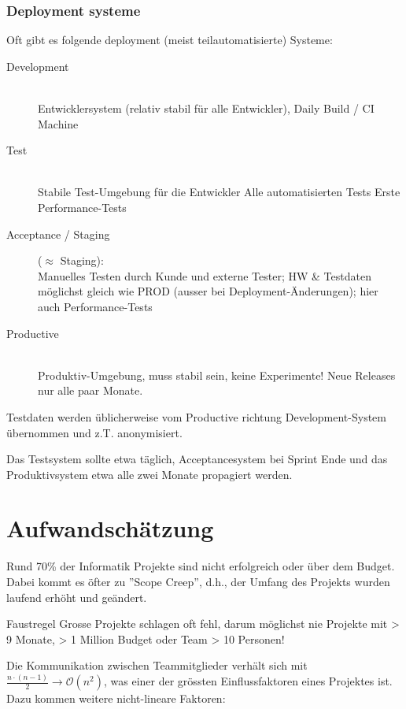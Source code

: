 \subsubsection{Deployment systeme}

Oft gibt es folgende deployment (meist teilautomatisierte) Systeme:
\begin{description}
	\item[Development] \hfill \\ Entwicklersystem (relativ stabil für alle Entwickler), Daily Build / CI Machine
	\item[Test] \hfill \\ Stabile Test-Umgebung für die Entwickler Alle automatisierten Tests Erste Performance-Tests
	\item[Acceptance / Staging] ($\approx$ Staging): \hfill \\ Manuelles Testen durch Kunde und externe Tester; HW \& Testdaten möglichst gleich wie PROD (ausser bei Deployment-Änderungen); hier auch Performance-Tests
	\item[Productive] \hfill \\ Produktiv-Umgebung, muss stabil sein, keine Experimente! Neue Releases nur alle paar Monate.
\end{description}

Testdaten werden üblicherweise vom Productive richtung Development-System übernommen und z.T. anonymisiert.

Das Testsystem sollte etwa täglich, Acceptancesystem bei Sprint Ende und das Produktivsystem etwa alle zwei Monate propagiert werden.

\section{Aufwandschätzung}

Rund 70\% der Informatik Projekte sind nicht erfolgreich oder über dem Budget. Dabei kommt es öfter zu ''Scope Creep'', d.h., der Umfang des Projekts wurden laufend erhöht und geändert.

\begin{remember}{Faustregel}{}
Grosse Projekte schlagen oft fehl, darum möglichst nie Projekte mit > 9 Monate, > 1 Million Budget oder Team > 10 Personen!
\end{remember}

Die Kommunikation zwischen Teammitglieder verhält sich mit $\frac{n \cdot (n - 1)}{2} \rightarrow \mathcal{O}(n^2)$, was einer der grössten Einflussfaktoren eines Projektes ist. Dazu kommen weitere nicht-lineare Faktoren: 

